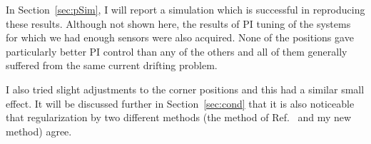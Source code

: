 In Section~\ref{sec:pSim}, I will report a simulation which is
successful in reproducing these results.  Although not shown here, the
results of PI tuning of the systems for which we had enough sensors
were also acquired.  None of the positions gave particularly better PI
control than any of the others and all of them generally suffered from
the same current drifting problem.

I also tried slight adjustments to the corner positions and this had a
similar small effect.  It will be discussed further in
Section~\ref{sec:cond} that it is also noticeable that regularization
by two different methods (the method of Ref.~\cite{bea}
and my new method) agree.





